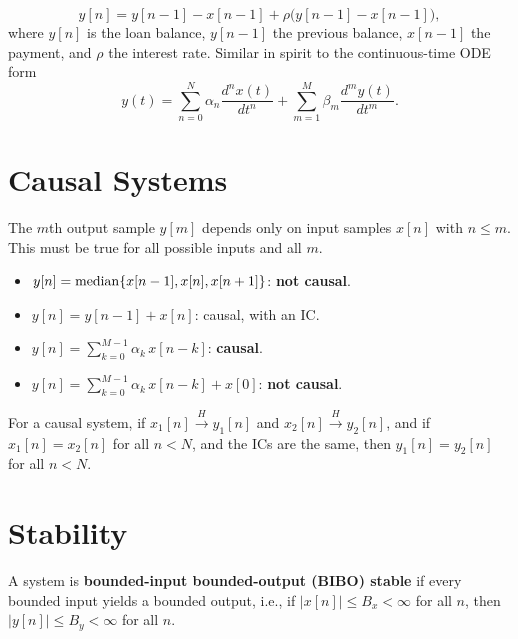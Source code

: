 \documentclass[handout_subfiles_root.tex]{subfiles}
\begin{document}
\begin{examplebox}[title={Examples: Accumulator (FIR Filter)}, handout mark=7]
$$y[n] = y[n-1] - x[n-1] + \rho\big(y[n-1]-x[n-1]\big),$$
where $y[n]$ is the loan balance, $y[n-1]$ the previous balance, $x[n-1]$
the payment, and $\rho$ the interest rate.
Similar in spirit to the continuous-time ODE form
$$y(t) = \sum_{n=0}^{N} \alpha_n\frac{d^n x(t)}{dt^n}
  + \sum_{m=1}^{M} \beta_m\frac{d^m y(t)}{dt^m}.$$
\end{examplebox}

\section{Causal Systems}\label{sec:causality}

\begin{defbox}[title={Definition (Causality)}]
The $m$th output sample $y[m]$ depends only on input samples $x[n]$ with
$n \le m$. This must be true for all possible inputs and all $m$.
\end{defbox}

\begin{examplebox}[title={Examples}]
\begin{itemize}
  \item $y[n] = \operatorname{median}\{x[n-1],x[n],x[n+1]\}$: \textbf{not causal}.
  \item $y[n] = y[n-1] + x[n]$: causal, with an IC.
  \item $y[n] = \sum_{k=0}^{M-1}\alpha_k\,x[n-k]$: \textbf{causal}.
  \item $y[n] = \sum_{k=0}^{M-1}\alpha_k\,x[n-k] + x[0]$: \textbf{not causal}.
\end{itemize}
\end{examplebox}

\begin{factbox}[title={Property (Causal Systems and Matching Inputs)}, handout mark=8]
For a causal system, if $x_1[n]\xrightarrow{H}y_1[n]$ and
$x_2[n]\xrightarrow{H}y_2[n]$, and if $x_1[n]=x_2[n]$ for all $n<N$, and the
ICs are the same, then $y_1[n] = y_2[n]$ for all $n<N$.
\end{factbox}

\section{Stability}\label{sec:stability}

\begin{defbox}[title={Definition (BIBO Stability)}]
A system is \textbf{bounded-input bounded-output (BIBO) stable} if every
bounded input yields a bounded output, i.e., if $|x[n]| \le B_x < \infty$
for all $n$, then $|y[n]| \le B_y < \infty$ for all $n$.
\end{defbox}
\end{document}

